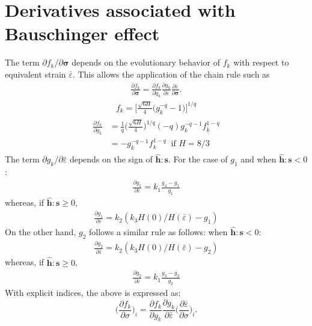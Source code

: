\documentclass[12pt]{amsart}
\begin{document}
\section{Derivatives associated with Bauschinger effect}
\label{sec:bauschinger}
The term $\partial f_k/\partial\mathbf{\sigma}$ depends on the evolutionary behavior of $f_k$ with respect to equivalent strain $\bar{\varepsilon}$.
This allows the application of the chain rule such as
\begin{eqnarray}
  \label{eq:dphib7}
  \frac{\partial f_k}{\partial\mathbf{\sigma}}=\frac{\partial f_k}{\partial g_k} \frac{\partial g_k}{\partial \bar{\varepsilon}}  \frac{\partial{\bar{\varepsilon}}}{\partial\mathbf{\sigma}}.
\end{eqnarray}
\begin{eqnarray}
  \label{eq:fk1}
  f_k = \bigg[ \frac{\sqrt{6H}}{4}   \Big(  g_k^{-q} - 1  \Big)  \bigg] ^{1/q}
\end{eqnarray}
\begin{eqnarray}
  \label{eq:fk2}
  \begin{split}
  \frac{\partial f_k}{\partial{g_k}} &= \frac{1}{q}   \bigg(\frac{\sqrt{6H}}{4} \bigg)^{1/q}  (-q) g_k^{-q-1}    f_k^{1-q}\\
  &=-g_k^{-q-1} f_k^{1-q}  \ \text{  if } H=8/3
  \end{split}
\end{eqnarray}
The term $  \partial{g_k}/\partial{\bar{\varepsilon}} $ depends on the sign of $\hat{\mathbf{h}}:\mathbf{s}$.
For the case of $g_1$ and when  $\hat{\mathbf{h}}:\mathbf{s}<0$:
\begin{eqnarray}
  \label{eq:dbau2}
\frac{\partial{g_1}}{\partial{\bar{\varepsilon}}}=k_1 \frac{g_4-g_1}{g_1}
\end{eqnarray}
whereas, if $\hat{\mathbf{h}}:\mathbf{s}\ge0$,
\begin{eqnarray}
  \label{eq:dbau3}
\frac{\partial{g_1}}{\partial{\bar{\varepsilon}}}=k_2 (k_3 H(0)/H(\bar{\varepsilon})-g_1)
\end{eqnarray}
On the other hand, $g_2$ follows a similar rule as follows:
when  $\hat{\mathbf{h}}:\mathbf{s}<0$:
\begin{eqnarray}
  \label{eq:dbau4}
  \frac{\partial{g_2}}{\partial{\bar{\varepsilon}}}=k_2 (k_3 H(0)/H(\bar{\varepsilon})-g_2)
\end{eqnarray}
whereas, if $\hat{\mathbf{h}}:\mathbf{s}\ge0$,
\begin{eqnarray}
  \label{eq:dbau5}
  \frac{\partial{g_2}}{\partial{\bar{\varepsilon}}}=k_1 \frac{g_3-g_2}{g_2}
\end{eqnarray}
With explicit indices, the above is expressed as:
\begin{equation}
  \label{eq:dphib8}
  \bigg(\frac{\partial f_k}{\partial \sigma}\bigg)_i = \frac{\partial f_k}{\partial g_k} \frac{\partial g_k}{\partial \bar{\varepsilon}}  \bigg(\frac{\partial\bar{\varepsilon}}{\partial\sigma}\bigg)_i.
\end{equation}
\newline
\end{document}
